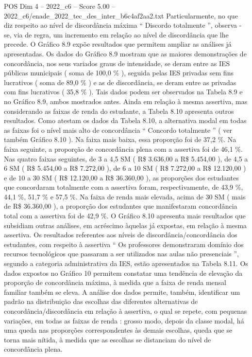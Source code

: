 \begin{textsample}{POS Dim 4 – 2022\_c6 – Score 5.00 – 2022\_c6/enade\_2022\_tec\_des\_inter\_b6c4af2aa2.txt}
Particularmente, no que diz respeito ao nível de discordância máxima “ Discordo totalmente ”, observa -se, via de regra, um incremento em relação ao nível de discordância que lhe precede.
O Gráfico 8.9 expõe resultados que permitem ampliar as análises já apresentadas.
Os dados do Gráfico 8.9 mostram que as maiores demonstrações de concordância, nos seus variados graus de intensidade, se deram entre as IES públicas municipais ( soma de 100,0 \% ), seguida pelas IES privadas sem fins lucrativos ( soma de 89,0 \% ) e as de discordância, se deram entre as privadas com fins lucrativos ( 35,8 \% ).
Tais dados podem ser observados na Tabela 8.9 e no Gráfico 8.9, ambos mostrados antes.
Ainda em relação à mesma assertiva, mas considerando as faixas de renda do estudante, a Tabela 8.10 apresenta outros resultados.
Como atestam os dados da Tabela 8.10, a alternativa modal em todas as faixas foi o nível mais alto de concordância “ Concordo totalmente ” ( ver também Gráfico 8.10 ).
Na faixa mais baixa, essa proporção foi de 37,2 \%.
Na faixa seguinte, a proporção de concordância plena com a assertiva foi de 46,1 \%.
Nas quatro faixas seguintes, de 3 a 4,5 SM ( R\$ 3.636,00 a R\$ 5.454,00 ), de 4,5 a 6 SM ( R\$ 5.454,00 a R\$ 7.272,00 ), de 6 a 10 SM ( R\$ 7.272,00 a R\$ 12.120,00 ) e de 10 a 30 SM ( R\$ 12.120,00 a R\$ 36.360,00 ), as proporções dos estudantes que concordaram totalmente com a assertiva foram, respectivamente, de 43,9 \%, 44,1 \%, 51,7 \% e 57,5 \%.
Na faixa de renda mais elevada, acima de 30 SM ( mais de R\$ 36.360,00 ), a proporção dos estudantes que manifestaram concordância total com a assertiva foi de 42,9 \%.
O Gráfico 8.10 apresenta mais resultados que subsidiam outras análises, em acréscimo àquelas já expostas, em relação à mesma assertiva.
Os resultados referentes aos níveis de discordância/concordância dos estudantes, com respeito à assertiva “ Os professores demonstraram domínio dos recursos tecnológicos que passaram a ser utilizados nas aulas não presenciais ”, segundo a categoria administrativa da IES, estão apresentados na Tabela 8.11.
Os dados expostos no Gráfico 10 permitem constatar uma tendência de elevação da proporção de concordância máxima, à medida que a faixa de renda mensal familiar também se eleva.
A análise dos dados permite, também, identificar um padrão na distribuição das escolhas das diferentes alternativas de concordância/discordância em relação à assertiva, o qual se repete, com pequenas variações, em todas as faixas de renda : grosso modo, depois da classe modal, há uma queda nas proporções correspondentes às demais escolhas, queda que se torna mais nítida, à medida que as escolhas se distanciam do nível de concordância plena.

\end{textsample}

